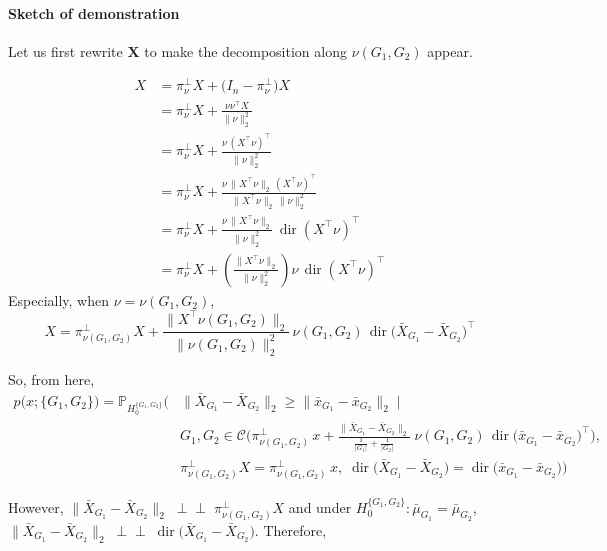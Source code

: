 \documentclass[11pt,a4paper]{article}
\begin{document}
\paragraph{Sketch of demonstration} Let us first rewrite $\mathbf{X}$ to make the decomposition along ${\nu(G_1, G_2)}$ appear.

\begin{align*}
X &= \pi^{\perp}_{\nu} X + \big(I_n - \pi^{\perp}_{\nu}\big) X \\
  &= \pi^{\perp}_{\nu} X + \frac{\nu \nu^{\top} X}{\|\nu\|_2^2} \\
  &= \pi^{\perp}_{\nu} X + \frac{\nu\,(X^{\top}\nu)^{\top}}{\|\nu\|_2^2} \\
  &= \pi^{\perp}_{\nu} X + \frac{\nu\,\|X^{\top}\nu\|_2\,(X^{\top}\nu)^{\top}}{\|X^{\top}\nu\|_2\,\|\nu\|_2^2} \\
  &= \pi^{\perp}_{\nu} X + \frac{\nu\,\|X^{\top}\nu\|_2}{\|\nu\|_2^2}\,\operatorname{dir}(X^{\top}\nu)^{\top} \\
  &= \pi^{\perp}_{\nu} X + \left(\frac{\|X^{\top}\nu\|_2}{\|\nu\|_2^2}\right)\nu\,\operatorname{dir}(X^{\top}\nu)^{\top}
\end{align*}
Especially, when $\nu = \nu(G_1, G_2)$,
\[X = \pi^{\perp}_{\nu(G_1,G_2)} X + \frac{\|X^{\top}\nu(G_1,G_2)\|_2}{\|\nu(G_1,G_2)\|_2^2}\,\nu(G_1,G_2)\,\operatorname{dir}\big(\bar X_{G_1} - \bar X_{G_2}\big)^{\top}\]

So, from here,
\begin{align*}
p\big(x; \{G_1,G_2\}\big)
= \mathbb{P}_{H_0^{\{G_1,G_2\}}}\Bigg(
&\big\|\bar X_{G_1} - \bar X_{G_2}\big\|_2 \ge \big\|\bar x_{G_1} - \bar x_{G_2}\big\|_2
\;\Bigg|\; \\
&G_1, G_2 \in \mathcal{C}\Bigg(
\pi^{\perp}_{\nu(G_1,G_2)}\, x
+ \frac{\big\|\bar X_{G_1} - \bar X_{G_2}\big\|_2}{\frac{1}{|G_1|} + \frac{1}{|G_2|}}\;
\nu(G_1,G_2)\, \operatorname{dir}\big(\bar x_{G_1} - \bar x_{G_2}\big)^{\top}\Bigg),\\
&\pi^{\perp}_{\nu(G_1,G_2)} X = \pi^{\perp}_{\nu(G_1,G_2)}\, x,\;
\operatorname{dir}\big(\bar X_{G_1} - \bar X_{G_2}\big) = \operatorname{dir}\big(\bar x_{G_1} - \bar x_{G_2}\big)
\Bigg)
\end{align*}

However, $\big\|\bar X_{G_1} - \bar X_{G_2}\big\|_2 \;\perp\!\!\!\perp\; \pi^{\perp}_{\nu(G_1,G_2)} X$ and under $H_0^{\{G_1,G_2\}} : \bar\mu_{G_1} = \bar\mu_{G_2}$, $\big\|\bar X_{G_1} - \bar X_{G_2}\big\|_2
\;\perp\!\!\!\perp\;
\operatorname{dir}\big(\bar X_{G_1} - \bar X_{G_2}\big)$. Therefore,
\end{document}
